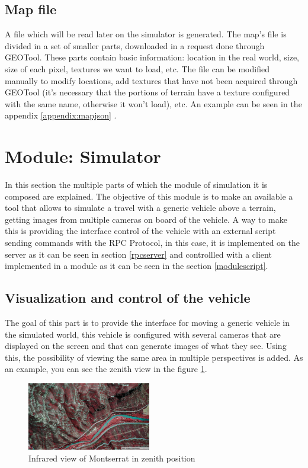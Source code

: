 \documentclass[10pt,a4paper,twocolumn,twoside]{article}
\begin{document}
\subsection{Map file}
 
A file which will be read later on the simulator is generated.  The map's file is divided in a set of smaller parts, downloaded in a request done through GEOTool. These parts contain basic information: location in the real world, size, size of each pixel, textures we want to load, etc. The file can be modified manually to modify locations, add textures that have not been acquired through GEOTool (it's necessary that the portions of terrain have a texture configured with the same name, otherwise it won't load), etc. An example can be seen in the appendix \ref{appendix:mapjson} .

\section{Module: Simulator}

In this section the multiple parts of which the module of simulation it is composed are explained. The objective of this module is to make an available a tool that allows to simulate a travel with a generic vehicle above a terrain, getting images from multiple cameras on board of the vehicle. A way to make this is providing the interface control of the vehicle with an external script sending commands with the RPC Protocol, in this case, it is implemented on the server as it can be seen in section \ref{rpcserver} and controllled with a client implemented in a module as it can be seen in the section \ref{modulescript}.

\subsection{Visualization and control of the vehicle}

The goal of this part is to provide the interface for moving a generic vehicle in the simulated world, this vehicle is configured with several cameras that are displayed on the screen and that can generate images of what they see. Using this, the possibility of viewing the same area in multiple perspectives is added. As an example, you can see the zenith view in the figure \ref{fig-montserratir}.

\begin{figure}[!h]
\centering
  	\includegraphics[width=0.48\textwidth]{cenitalviewir}
	\caption{Infrared view of Montserrat in zenith position}
	\label{fig-montserratir}
\end{figure}
\end{document}
